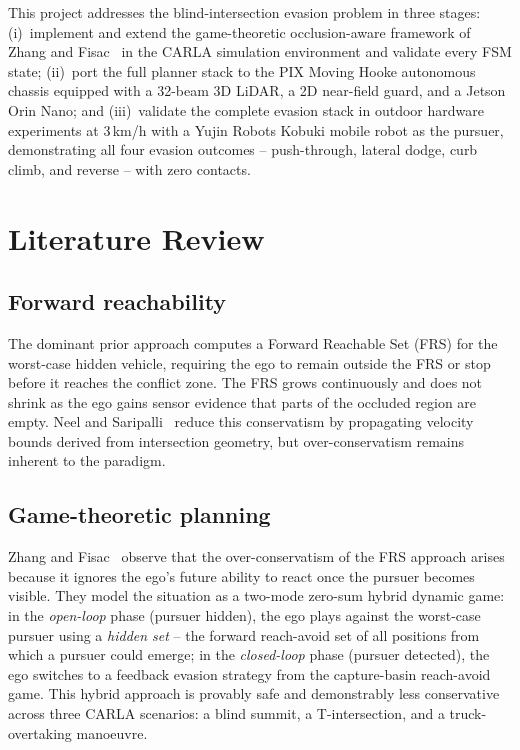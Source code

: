 \documentclass[11pt,a4paper]{article}
\begin{document}
This project addresses the blind-intersection evasion problem in three stages:
(i)~implement and extend the game-theoretic occlusion-aware framework of Zhang and
Fisac~\cite{zhang2021occlusion} in the CARLA simulation environment and validate every
FSM state; (ii)~port the full planner stack to the PIX Moving Hooke autonomous
chassis equipped with a 32-beam 3D LiDAR, a 2D near-field guard, and a Jetson Orin
Nano; and (iii)~validate the complete evasion stack in outdoor hardware experiments at
3\,km/h with a Yujin Robots Kobuki mobile robot as the pursuer, demonstrating all four evasion outcomes -- push-through,
lateral dodge, curb climb, and reverse -- with zero contacts.

\section{Literature Review}

\subsection*{Forward reachability} The dominant prior approach computes a Forward
Reachable Set (FRS) for the worst-case hidden vehicle, requiring the ego to remain
outside the FRS or stop before it reaches the conflict zone. The FRS grows continuously
and does not shrink as the ego gains sensor evidence that parts of the occluded region
are empty. Neel and Saripalli~\cite{neel2020occluded} reduce this conservatism by
propagating velocity bounds derived from intersection geometry, but over-conservatism
remains inherent to the paradigm.

\subsection*{Game-theoretic planning} Zhang and Fisac~\cite{zhang2021occlusion} observe
that the over-conservatism of the FRS approach arises because it ignores the ego's
future ability to react once the pursuer becomes visible. They model the situation as a
two-mode zero-sum hybrid dynamic game: in the \emph{open-loop} phase (pursuer hidden),
the ego plays against the worst-case pursuer using a \emph{hidden set} -- the
forward reach-avoid set of all positions from which a pursuer could emerge; in the
\emph{closed-loop} phase (pursuer detected), the ego switches to a feedback evasion
strategy from the capture-basin reach-avoid game. This hybrid approach is provably safe
and demonstrably less conservative across three CARLA scenarios: a blind summit, a
T-intersection, and a truck-overtaking manoeuvre.
\end{document}

